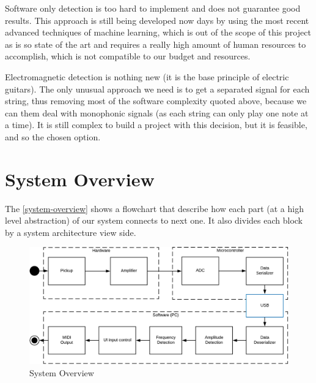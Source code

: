 Software only detection is too hard to implement and does not guarantee good results.
This approach is still being developed now days by using the most recent advanced
techniques of machine learning, which is out of the scope of this project as is so
state of the art and requires a really high amount of human resources to accomplish,
which is not compatible to our budget and resources. 

Electromagnetic detection is nothing new (it is the base principle of electric guitars).
The only unusual approach we need is to get a separated signal for each string, thus
removing most of the software complexity quoted above, because we can them deal
with monophonic signals (as each string can only play one note at a time). It is
still complex to build a project with this decision, but it is feasible, and so
the chosen option.

\section{System Overview}
The \autoref{system-overview} shows a flowchart that describe how each part
(at a high level abstraction) of our system connects to next one. It also divides
each block by a system architecture view side.

\begin{figure}[!htpb]
  \centering
  \caption{System Overview}
  \label{system-overview}
  \includegraphics[scale=0.85]{images/system-overview}
\end{figure}